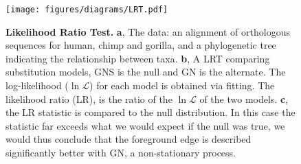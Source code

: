 \begin{figure}[htbp]
\centering
\texttt{[image: figures/diagrams/LRT.pdf]}
\caption{\textbf{Likelihood Ratio Test.} \textbf{a}, The data: an alignment of orthologous sequences for human, chimp and gorilla, and a phylogenetic tree indicating the relationship between taxa. \textbf{b}, A LRT comparing substitution models, GNS is the null and GN is the alternate. The log-likelihood ($\ln\mathcal{L}$) for each model is obtained via fitting. The likelihood ratio (LR), is the ratio of the $\ln\mathcal{L}$ of the two models. \textbf{c}, the LR statistic is compared to the null distribution. In this case the statistic far exceeds what we would expect if the null was true, we would thus conclude that the foreground edge is described significantly better with GN, a non-stationary process.}
\label{fig:lrt}
\end{figure}